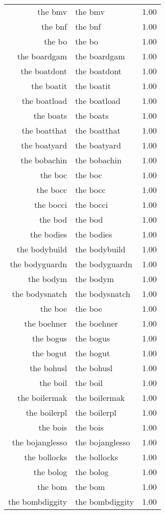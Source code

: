 \begin{table}[ht]
\begin{tabular}{rlr}
  the bmv & the bmv & 1.00 \\ 
  the bnf & the bnf & 1.00 \\ 
  the bo & the bo & 1.00 \\ 
  the boardgam & the boardgam & 1.00 \\ 
  the boatdont & the boatdont & 1.00 \\ 
  the boatit & the boatit & 1.00 \\ 
  the boatload & the boatload & 1.00 \\ 
  the boats & the boats & 1.00 \\ 
  the boatthat & the boatthat & 1.00 \\ 
  the boatyard & the boatyard & 1.00 \\ 
  the bobachin & the bobachin & 1.00 \\ 
  the boc & the boc & 1.00 \\ 
  the bocc & the bocc & 1.00 \\ 
  the bocci & the bocci & 1.00 \\ 
  the bod & the bod & 1.00 \\ 
  the bodies & the bodies & 1.00 \\ 
  the bodybuild & the bodybuild & 1.00 \\ 
  the bodyguardn & the bodyguardn & 1.00 \\ 
  the bodym & the bodym & 1.00 \\ 
  the bodysnatch & the bodysnatch & 1.00 \\ 
  the boe & the boe & 1.00 \\ 
  the boehner & the boehner & 1.00 \\ 
  the bogus & the bogus & 1.00 \\ 
  the bogut & the bogut & 1.00 \\ 
  the bohusl & the bohusl & 1.00 \\ 
  the boil & the boil & 1.00 \\ 
  the boilermak & the boilermak & 1.00 \\ 
  the boilerpl & the boilerpl & 1.00 \\ 
  the bois & the bois & 1.00 \\ 
  the bojanglesso & the bojanglesso & 1.00 \\ 
  the bollocks & the bollocks & 1.00 \\ 
  the bolog & the bolog & 1.00 \\ 
  the bom & the bom & 1.00 \\ 
  the bombdiggity & the bombdiggity & 1.00 \\ 

\end{tabular}
\end{table}
